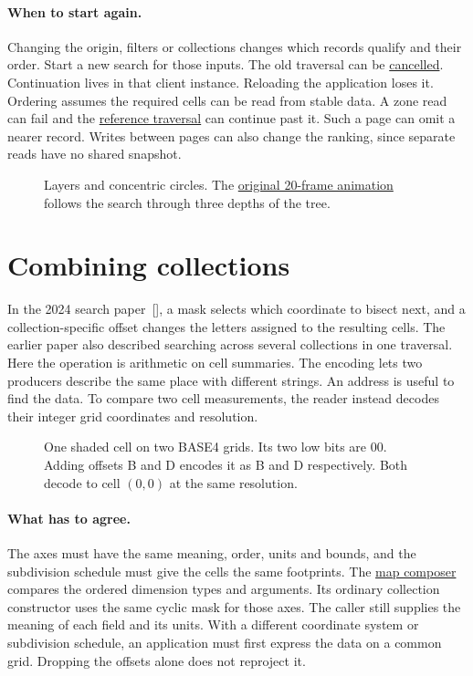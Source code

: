 \documentclass[11pt]{article}
\begin{document}
\paragraph{When to start again.}
Changing the origin, filters or collections changes which records qualify and their order. Start a new search for those inputs. The old traversal can be \href{https://github.com/indexus/sdk/blob/6e1bba2/src/local/cancellation.test.mjs}{cancelled}. Continuation lives in that client instance. Reloading the application loses it. Ordering assumes the required cells can be read from stable data. A zone read can fail and the \href{https://github.com/indexus/sdk/blob/6e1bba2/src/local/exploration.js}{reference traversal} can continue past it. Such a page can omit a nearer record. Writes between pages can also change the ranking, since separate reads have no shared snapshot.

\begin{figure}[H]
    \centering
    \caption{Layers and concentric circles. The \href{https://indexus.io/papers/animations/search-algorithm.gif}{original 20-frame animation} follows the search through three depths of the tree.}
\end{figure}

\section{Combining collections}\hypertarget{ix:composition}{}
In the 2024 search paper~[], a mask selects which coordinate to bisect next, and a collection-specific offset changes the letters assigned to the resulting cells. The earlier paper also described searching across several collections in one traversal. Here the operation is arithmetic on cell summaries. The encoding lets two producers describe the same place with different strings. An address is useful to find the data. To compare two cell measurements, the reader instead decodes their integer grid coordinates and resolution.

\begin{figure}[H]
    \centering
    \caption{One shaded cell on two BASE4 grids. Its two low bits are 00. Adding offsets B and D encodes it as B and D respectively. Both decode to cell $(0,0)$ at the same resolution.}
\end{figure}

\paragraph{What has to agree.}
The axes must have the same meaning, order, units and bounds, and the subdivision schedule must give the cells the same footprints. The \href{https://github.com/indexus/sdk/blob/6e1bba2/src/map/heat/compose.js}{map composer} compares the ordered dimension types and arguments. Its ordinary collection constructor uses the same cyclic mask for those axes. The caller still supplies the meaning of each field and its units. With a different coordinate system or subdivision schedule, an application must first express the data on a common grid. Dropping the offsets alone does not reproject it.
\end{document}

